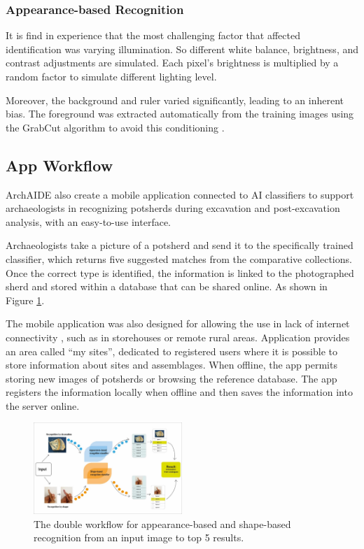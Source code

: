 \documentclass[journal]{IEEEtran}
\begin{document}
	\subsubsection{Appearance-based Recognition}
	
	It is find in experience that the most challenging factor that affected identification was varying illumination. So different white balance, brightness, and contrast adjustments are simulated. Each pixel's brightness is multiplied by a random factor to simulate different lighting level.
	
	Moreover, the background and ruler varied significantly, leading to an inherent bias. The foreground was extracted automatically from the training images using the GrabCut algorithm to avoid this conditioning \cite{GrabCut}.
	
	\subsection{App Workflow}\label{workflow}
	
	ArchAIDE also create a mobile application connected to AI classifiers to support archaeologists in recognizing potsherds during excavation and post-excavation analysis, with an easy-to-use interface.
	
	Archaeologists take a picture of a potsherd and send it to the specifically trained classifier, which returns five suggested matches from the comparative collections. Once the correct type is identified, the information is linked to the photographed sherd and stored within a database that can be shared online. As shown in Figure \ref{pic:workflow}.
	
	The mobile application was also designed for allowing the use in lack of internet connectivity , such as in storehouses or remote rural areas. Application provides an area called ``my sites'', dedicated to registered users where it is possible to store information about sites and assemblages. When offline, the app permits storing new images of potsherds or browsing the reference database. The app registers the information locally when offline and then saves the information into the server online.
	
	\begin{figure}[htbp]
		\centering
		\includegraphics[width=0.5\textwidth]{./picture/workflow.png}
		\caption{The double workflow for appearance-based and shape-based recognition from an input image to top 5 results.}
		\label{pic:workflow}
	\end{figure}  
	
\end{document}

